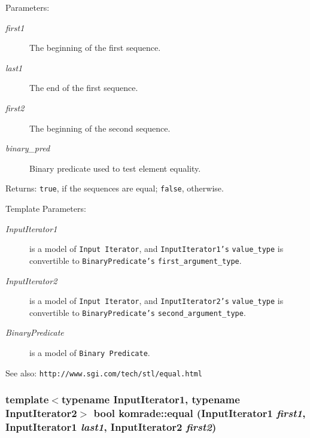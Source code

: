\begin{Desc}
\item[Parameters:]
\begin{description}
\item[{\em first1}]The beginning of the first sequence. \item[{\em last1}]The end of the first sequence. \item[{\em first2}]The beginning of the second sequence. \item[{\em binary\_\-pred}]Binary predicate used to test element equality. \end{description}
\end{Desc}
\begin{Desc}
\item[Returns:]{\tt true}, if the sequences are equal; {\tt false}, otherwise.\end{Desc}
\begin{Desc}
\item[Template Parameters:]
\begin{description}
\item[{\em InputIterator1}]is a model of {\tt Input Iterator}, and {\tt InputIterator1's} {\tt value\_\-type} is convertible to {\tt BinaryPredicate's} {\tt first\_\-argument\_\-type}. \item[{\em InputIterator2}]is a model of {\tt Input Iterator}, and {\tt InputIterator2's} {\tt value\_\-type} is convertible to {\tt BinaryPredicate's} {\tt second\_\-argument\_\-type}. \item[{\em BinaryPredicate}]is a model of {\tt Binary Predicate}.\end{description}
\end{Desc}
\begin{Desc}
\item[See also:]{\tt http://www.sgi.com/tech/stl/equal.html} \end{Desc}
\subsubsection[equal]{\setlength{\rightskip}{0pt plus 5cm}template$<$typename InputIterator1, typename InputIterator2$>$ bool komrade::equal (InputIterator1 {\em first1}, \/  InputIterator1 {\em last1}, \/  InputIterator2 {\em first2})\hspace{0.3cm}{\tt  [inline]}}\label{group__comparisons_g703b0dd762ec8a141d333d5c00c01994}


